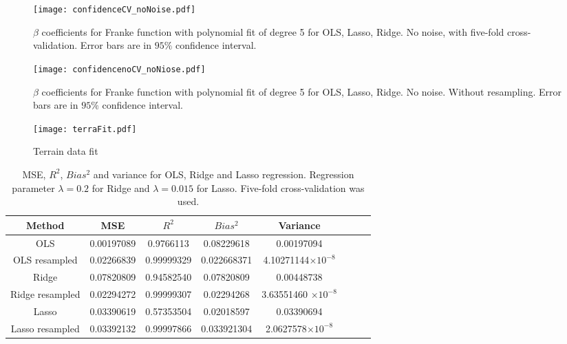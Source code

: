 \documentclass[10pt]{article}
\begin{document}
\begin{figure}
	\centerline{\texttt{[image: confidenceCV\_noNoise.pdf]}}
	\caption{$\beta$ coefficients for Franke function with polynomial fit of degree 5 for OLS, Lasso, Ridge. No noise, with five-fold cross-validation. Error bars are in $95\%$ confidence interval.}
	\label{plt:BetaNONoiseCV}
\end{figure}

\begin{figure}
	\centerline{\texttt{[image: confidencenoCV\_noNiose.pdf]}}
	\caption{$\beta$ coefficients for Franke function with polynomial fit of degree 5 for OLS, Lasso, Ridge. No noise. Without resampling. Error bars are in $95\%$ confidence interval.}
	\label{plt:BetaNONoiseNoCV}
\end{figure}

\begin{figure}
	\centerline{\texttt{[image: terraFit.pdf]}}
	\caption{Terrain data fit}
	\label{plt:terraFit}
\end{figure}

\begin{table}
	\begin{tabular}{ |c|c|c|c|c|c|c|c|} 
		\hline
		Method & MSE  & $R^2$ & $Bias^2$ & Variance    \\
		\hline 
		\hline  
		OLS & 0.00197089  & 0.9766113 & 0.08229618 & 0.00197094  \\
		\hline  
		OLS resampled & 0.02266839  & 0.99999329 & 0.022668371 & 4.10271144$\times 10^{-8}$  \\
		\hline
		Ridge & 0.07820809  &0.94582540& 0.07820809 &  0.00448738   \\ 
				\hline
		Ridge resampled & 0.02294272  & 0.99999307 & 0.02294268 & 3.63551460 $\times 10^{-8}$    \\ 
		\hline
		Lasso & 0.03390619  & 0.57353504 & 0.02018597 & 0.03390694    \\ 
		\hline
		Lasso resampled & 0.03392132  & 0.99997866 & 0.033921304 & 2.0627578$\times 10^{-8}$    \\ 
		\hline
	\end{tabular}
	\caption{MSE, $R^2$, $Bias^2$ and variance for OLS, Ridge and Lasso regression. Regression parameter $\lambda=0.2$ for Ridge and  $\lambda=0.015$  for Lasso. Five-fold cross-validation was used.} \label{tbl:one}
\end{table}


\end{document}
